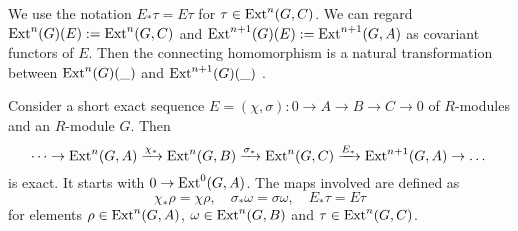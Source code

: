 We use the notation $E_*\tau = E\tau$ for  $\tau\in \operatorname{Ext}^{n}(G,C)$.
We can regard $\operatorname{Ext}^{n}(G)(E):=\operatorname{Ext}^{n}(G,C)$ and $\operatorname{Ext}^{n+1}(G)(E):=\operatorname{Ext}^{n+1}(G,A)$ as covariant functors of $E$.
Then the connecting homomorphism is a natural transformation between $\operatorname{Ext}^{n}(G)(\_)$ and $\operatorname{Ext}^{n+1}(G)(\_)$ \cite[p. 97]{maclane}.

\begin{theorem}\cite[Theorem III.9.1.]{maclane}
Consider a short exact sequence $E = (\chi,\sigma): 0 \to A \to B \to C \to 0$ of $R$-modules and an $R$-module $G$.
Then
\[
\dots\to
\operatorname{Ext}^{n}(G,A) \xrightarrow{\chi_*}
\operatorname{Ext}^{n}(G,B) \xrightarrow{\sigma_*}
\operatorname{Ext}^{n}(G,C) \xrightarrow{E_*}
\operatorname{Ext}^{n+1}(G,A) 
\to\dots
\]
is exact.
It starts with $0\rightarrow \operatorname{Ext}^{0}(G,A)$.
The maps involved are defined as
\begin{equation}
\label{eq:longexactexthomomorphisms}
\chi_*\rho = \chi \rho, \quad 
\sigma_*\omega = \sigma \omega, \quad
E_* \tau = E \tau
\end{equation}
for elements 
$\rho\in\operatorname{Ext}^{n}(G,A)$,
$\omega\in\operatorname{Ext}^{n}(G,B)$ 
and 
$\tau\in\operatorname{Ext}^{n}(G,C)$.
\end{theorem}
